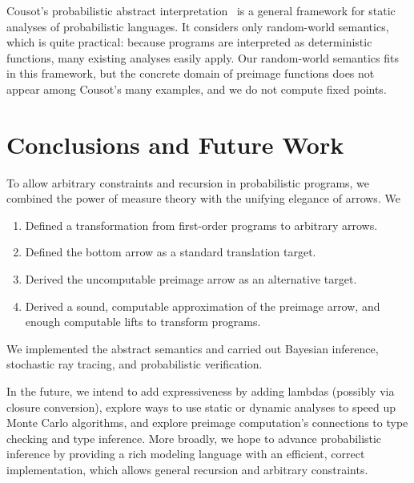 \documentclass{llncs}
\begin{document}
Cousot's probabilistic abstract interpretation~\cite{cit:cousot-2012esop-prob} is a general framework for static analyses of probabilistic languages.
It considers only random-world semantics, which is quite practical: because programs are interpreted as deterministic functions, many existing analyses easily apply.
Our random-world semantics fits in this framework, but the concrete domain of preimage functions does not appear among Cousot's many examples, and we do not compute fixed points.



\section{Conclusions and Future Work}

To allow arbitrary constraints and recursion in probabilistic programs, we combined the power of measure theory with the unifying elegance of arrows. We
\begin{enumerate}
	\item Defined a transformation from first-order programs to arbitrary arrows.
	\item Defined the bottom arrow as a standard translation target.
	\item Derived the uncomputable preimage arrow as an alternative target.
	\item Derived a sound, computable approximation of the preimage arrow, and enough computable lifts to transform programs.
\end{enumerate}
We implemented the abstract semantics and carried out Bayesian inference, stochastic ray tracing, and probabilistic verification.

In the future, we intend to add expressiveness by adding lambdas (possibly via closure conversion), explore ways to use static or dynamic analyses to speed up Monte Carlo algorithms, and explore preimage computation's connections to type checking and type inference.
More broadly, we hope to advance probabilistic inference by providing a rich modeling language with an efficient, correct implementation, which allows general recursion and arbitrary constraints.

\end{document}
